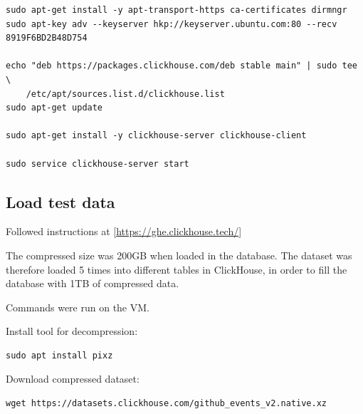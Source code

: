 \begin{verbatim}
sudo apt-get install -y apt-transport-https ca-certificates dirmngr
sudo apt-key adv --keyserver hkp://keyserver.ubuntu.com:80 --recv 8919F6BD2B48D754

echo "deb https://packages.clickhouse.com/deb stable main" | sudo tee \
    /etc/apt/sources.list.d/clickhouse.list
sudo apt-get update

sudo apt-get install -y clickhouse-server clickhouse-client

sudo service clickhouse-server start
\end{verbatim}

\subsection{Load test data}
\label{sec:orgf169474}
Followed instructions at
[\url{https://ghe.clickhouse.tech/}]

The compressed size was 200GB when loaded in the database.
The dataset was therefore loaded 5 times into different tables in ClickHouse,
in order to fill the database with 1TB of compressed data.

Commands were run on the VM.

Install tool for decompression:
\begin{verbatim}
sudo apt install pixz
\end{verbatim}

Download compressed dataset:
\begin{verbatim}
wget https://datasets.clickhouse.com/github_events_v2.native.xz
\end{verbatim}

